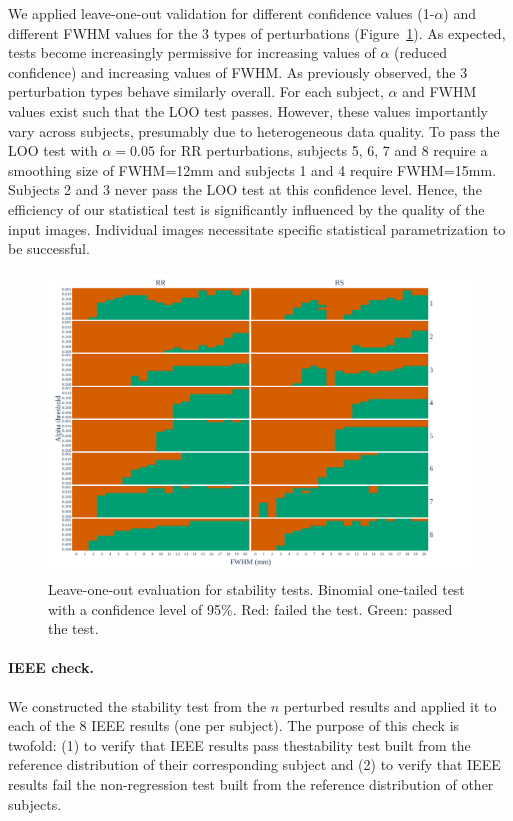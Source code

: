 \documentclass[lettersize,journal]{IEEEtran}
\begin{document}
We applied leave-one-out validation for different confidence values (1-$\alpha$) and different FWHM  values for the 3 types of perturbations (Figure~\ref{fig:loo_bonferroni}). As expected, tests become increasingly permissive for increasing values of $\alpha$ (reduced confidence) and increasing values of FWHM.
As previously observed, the 3 perturbation types behave similarly overall. For each subject, $\alpha$ and FWHM values exist such that the LOO test passes. However, these values importantly vary across subjects, presumably due to heterogeneous data quality. To pass the LOO test with $\alpha=0.05$ for RR perturbations, subjects 5, 6, 7 and 8 require a smoothing size of FWHM=12mm and subjects 1 and 4 require FWHM=15mm. Subjects 2 and 3 never pass the LOO test at this confidence level. Hence, the efficiency of our statistical test is significantly influenced by the quality of the input images. Individual images necessitate specific statistical parametrization to be successful.

\begin{figure}
    \centering
    \includegraphics[width=\linewidth]{figures/exclude_mct_fwe_bonferroni.pdf}
    \caption{Leave-one-out evaluation for stability tests.
        Binomial one-tailed test with a confidence level of 95\%.
        Red: failed the test. Green: passed the test.}
    \label{fig:loo_bonferroni}
\end{figure}


\paragraph{IEEE check.} We constructed the stability test from the $n$ perturbed results and applied it to each of the 8 IEEE results (one per subject). The purpose of this check is twofold: (1) to verify that IEEE results pass thestability test built from the reference distribution of their corresponding subject and (2) to verify that IEEE results fail the non-regression test built from the reference distribution of other subjects.
\end{document}

